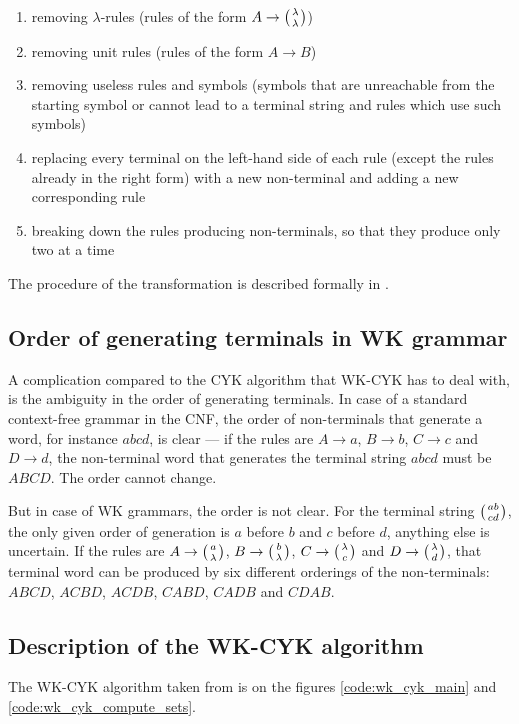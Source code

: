 \begin{enumerate}
  \item{removing $\lambda$-rules (rules of the form $A \rightarrow \wkpair{\lambda}{\lambda}$)}
  \item{removing unit rules (rules of the form $A \rightarrow B$)}
  \item{removing useless rules and symbols (symbols that are unreachable from the starting symbol or cannot lead to a terminal string and rules which use such symbols)}
  \item{replacing every terminal on the left-hand side of each rule (except the rules already in the right form) with a new non-terminal and adding a new corresponding rule}
  \item{breaking down the rules producing non-terminals, so that they produce only two at a time}
\end{enumerate}

The procedure of the transformation is described formally in \cite{WK_CYK}.


\subsection{Order of generating terminals in WK grammar}

A complication compared to the CYK algorithm that WK-CYK has to deal with, is the ambiguity in the order of generating terminals. In case of a standard context-free grammar in the CNF, the order of non-terminals that generate a word, for instance $abcd$, is clear --- if the rules are $A \rightarrow a$, $B \rightarrow b$, $C \rightarrow c$ and $D \rightarrow d$, the non-terminal word that generates the terminal string $abcd$ must be $ABCD$. The order cannot change.

But in case of WK grammars, the order is not clear. For the terminal string $\wkpair{ab}{cd}$, the only given order of generation is $a$ before $b$ and $c$ before $d$, anything else is uncertain. If the rules are $A \rightarrow \wkpair{a}{\lambda}$, $B \rightarrow \wkpair{b}{\lambda}$, $C \rightarrow \wkpair{\lambda}{c}$ and $D \rightarrow \wkpair{\lambda}{d}$, that terminal word can be produced by six different orderings of the non-terminals:
$ABCD$, $ACBD$, $ACDB$, $CABD$, $CADB$ and $CDAB$.

\subsection{Description of the WK-CYK algorithm}
The WK-CYK algorithm taken from \cite{WK_CYK} is on the figures \ref{code:wk_cyk_main} and \ref{code:wk_cyk_compute_sets}.


